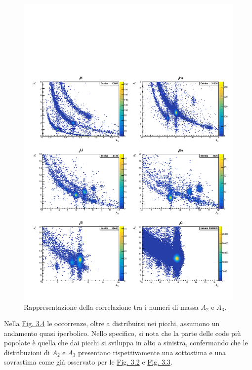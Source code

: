 \documentclass[12pt,a4paper,twoside]{report}
\begin{document}
	\begin{figure}[H]
		\centering
		\includegraphics[width=1.03\linewidth,center]{c_MultiCanvas3.pdf}
		\caption{Rappresentazione della correlazione tra i numeri di massa $A_2$ e $A_3$.}
		\label{fig:a3}
	\end{figure}
	Nella \hyperref[fig:a3]{Fig. 3.4} le occorrenze, oltre a distribuirsi nei picchi, assumono un andamento quasi iperbolico. Nello specifico, si nota che la parte delle code più popolate è quella che dai picchi si sviluppa in alto a sinistra, confermando che le distribuzioni di $A_2$ e $A_3$ presentano rispettivamente una sottostima e una sovrastima come già osservato per le \hyperref[fig:a1]{Fig. 3.2} e \hyperref[fig:a2]{Fig. 3.3}.
	
\end{document}
